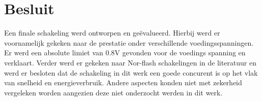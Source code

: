\section{Besluit}
Een finale schakeling werd ontworpen en geëvalueerd. Hierbij werd er voornamelijk gekeken naar de prestatie onder verschillende voedingsspanningen. Er werd een absolute limiet van 0.8V gevonden voor de voedings spanning en verklaart. Verder werd er gekeken naar Nor-flash schakelingen in de literatuur en werd er besloten dat de schakeling in dit werk een goede concurent is op het vlak van snelheid en energieverbruik. Andere aspecten konden niet met zekerheid vergeleken worden aangezien deze niet onderzocht werden in dit werk.